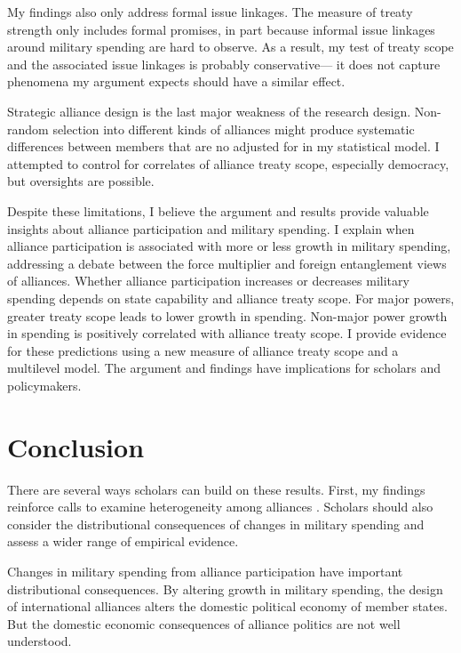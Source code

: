 \documentclass[12pt]{article}
\begin{document}
My findings also only address formal issue linkages. 
The measure of treaty strength only includes formal promises, in part because informal issue linkages around military spending are hard to observe. 
As a result, my test of treaty scope and the associated issue linkages is probably conservative--- it does not capture phenomena my argument expects should have a similar effect. 


Strategic alliance design is the last major weakness of the research design. 
Non-random selection into different kinds of alliances might produce systematic differences between members that are no adjusted for in my statistical model. 
I attempted to control for correlates of alliance treaty scope, especially democracy, but oversights are possible. 


Despite these limitations, I believe the argument and results provide valuable insights about alliance participation and military spending. 
I explain when alliance participation is associated with more or less growth in military spending, addressing a debate between the force multiplier and foreign entanglement views of alliances. 
Whether alliance participation increases or decreases military spending depends on state capability and alliance treaty scope. 
For major powers, greater treaty scope leads to lower growth in spending. 
Non-major power growth in spending is positively correlated with alliance treaty scope. 
I provide evidence for these predictions using a new measure of alliance treaty scope and a multilevel model. 
The argument and findings have implications for scholars and policymakers. 



\section{Conclusion}


There are several ways scholars can build on these results. 
First, my findings reinforce calls to examine heterogeneity among alliances \citep{Leeds2003, DigiuseppePoast2016}.
Scholars should also consider the distributional consequences of changes in military spending and assess a wider range of empirical evidence. 


Changes in military spending from alliance participation have important distributional consequences. 
By altering growth in military spending, the design of international alliances alters the domestic political economy of member states. 
But the domestic economic consequences of alliance politics are not well understood. 
\end{document}
